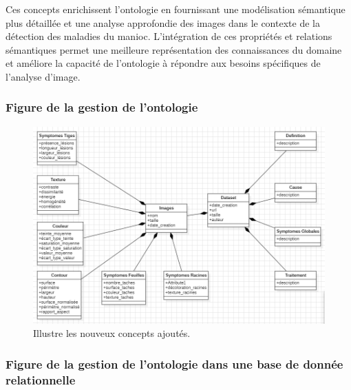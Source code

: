 Ces concepts enrichissent l'ontologie en fournissant une modélisation sémantique plus détaillée et une analyse approfondie des images dans le contexte de la détection des maladies du manioc. L'intégration de ces propriétés et relations sémantiques permet une meilleure représentation des connaissances du domaine et améliore la capacité de l'ontologie à répondre aux besoins spécifiques de l'analyse d'image.

\subsubsection*{Figure de la gestion de l'ontologie}

\begin{figure}[H]
	\begin{center}
		\begin{minipage}[b]{1\textwidth}
			\centering
			\includegraphics[width=\textwidth]{images/Diagramme.png}
		\end{minipage}
		\caption{Illustre les nouveux concepts ajoutés.}
	\end{center}
\end{figure}

\subsubsection*{Figure de la gestion de l'ontologie dans une base de donnée relationnelle}

